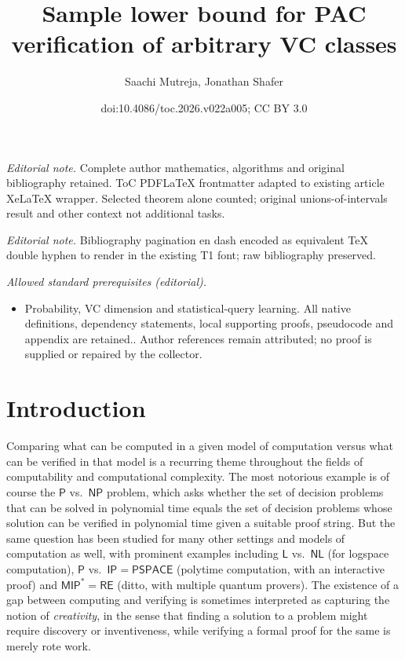 \documentclass[11pt]{article}
\title{Sample lower bound for PAC verification of arbitrary VC classes}
\author{Saachi Mutreja, Jonathan Shafer}
\date{doi:10.4086/toc.2026.v022a005; CC BY 3.0}
\begin{document}
\maketitle
\noindent\textit{Editorial note.} Complete author mathematics, algorithms and original bibliography retained. ToC PDFLaTeX frontmatter adapted to existing article XeLaTeX wrapper. Selected theorem alone counted; original unions-of-intervals result and other context not additional tasks.\par\medskip
\noindent\textit{Editorial note.} Bibliography pagination en dash encoded as equivalent TeX double hyphen to render in the existing T1 font; raw bibliography preserved.\par\medskip
\noindent\textit{Allowed standard prerequisites (editorial).}\begin{itemize}
\item Probability, VC dimension and statistical-query learning. All native definitions, dependency statements, local supporting proofs, pseudocode and appendix are retained.. Author references remain attributed; no proof is supplied or repaired by the collector.
\end{itemize}\medskip
\section{Introduction}

Comparing what can be computed in a given model of computation versus what can be verified in that model is a recurring theme throughout the fields of computability and computational complexity. The most notorious example is of course the $\mathsf{P}$ vs.\ $\mathsf{NP}$ problem, which asks whether the set of decision problems that can be solved in polynomial time equals the set of decision problems whose solution can be verified in polynomial time given a suitable proof string. But the same question has been studied for many other settings and models of computation as well, with prominent examples including $\mathsf{L}$ vs.\ $\mathsf{NL}$ (for logspace computation), $\mathsf{P}$ vs.\ $\mathsf{IP} = \mathsf{PSPACE}$ (polytime computation, with an interactive proof) and $\mathsf{MIP}^* = \mathsf{RE}$ (ditto, with multiple quantum provers). The existence of a gap between computing and verifying is sometimes interpreted as capturing the notion of \emph{creativity}, in the sense that finding a solution to a problem might require discovery or inventiveness, while verifying a formal proof for the same is merely rote work.
\end{document}
